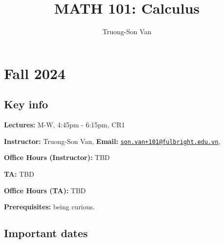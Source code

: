 \documentclass[
]{article}
\title{MATH 101: Calculus}
\author{Truong-Son Van}
\date{}
\begin{document}
\maketitle

{
\setcounter{tocdepth}{2}
\tableofcontents
}
\section*{Fall 2024}\label{fall-2024}

\subsection*{Key info}\label{key-info}

\textbf{Lectures:} M-W, 4:45pm - 6:15pm, CR1

\textbf{Instructor:} Truong-Son Van, \textbf{Email:} \href{mailto:son.van+101@fulbright.edu.vn}{\nolinkurl{son.van+101@fulbright.edu.vn}},

\textbf{Office Hours (Instructor):} TBD

\textbf{TA:} TBD

\textbf{Office Hours (TA):} TBD

\textbf{Prerequisites:} being curious.

\subsection*{Important dates}\label{important-dates}
\end{document}
